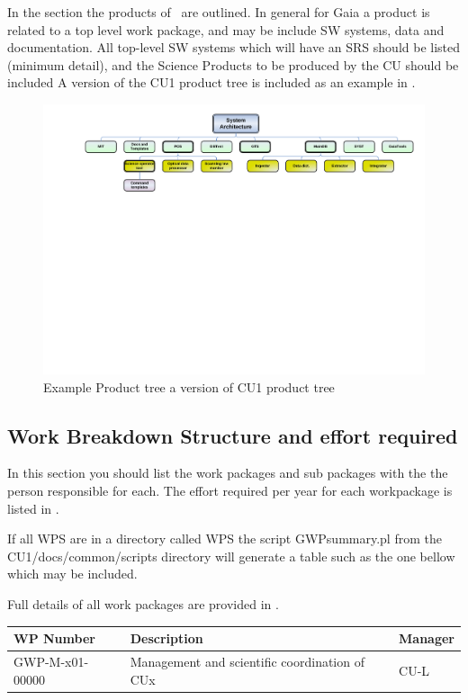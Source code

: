 \documentclass[DM,lsstdraft,SDP]{lsstdoc}
\begin{document}
In the section the products of \CU ~are outlined. In general for Gaia a
product is related to a top level work package, and may be include SW systems, data and documentation. All top-level SW systems which will have an SRS should be listed (minimum detail), and the Science Products to be produced by the CU should be included A version of the CU1 product tree is included as an example in .

\begin{figure}[htbp]
\begin{center}
 \includegraphics[scale=0.5,trim=0 12cm 0 0]{images/cu1Products}
\caption{Example Product tree a version of  CU1 product tree \label{fig:prod}}
\end{center}
\end{figure}


\subsection{Work Breakdown Structure and effort required}

In this section you should list the work packages and sub packages with the
the person responsible for each.  The effort required per year for each
workpackage is listed in .

If all WPS are in a directory called WPS the
script  GWPsummary.pl from the CU1/docs/common/scripts directory will
generate a table such as the one bellow which may be included.

Full details of all work packages are provided in .
\scriptsize
\begin{longtable}{|l|p{}|p{}|}\hline
WP Number & Description & Manager \\\hline
 GWP-M-x01-00000 & Management and scientific coordination of CUx & CU-L\\\hline
\end{longtable}
\normalsize
\end{document}
